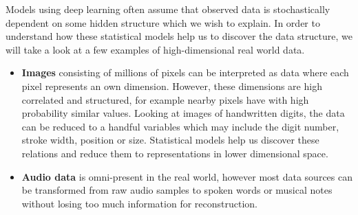 Models using deep learning often assume that observed data is stochastically dependent on some hidden structure which we wish to explain.
In order to understand how these statistical models help us to discover the data structure, we will take a look at a few examples of high-dimensional real world data.
\begin{itemize}
  \item \textbf{Images} consisting of millions of pixels can be interpreted as data where each pixel represents an own dimension.
  However, these dimensions are high correlated and structured, for example nearby pixels have with high probability similar values.
  Looking at images of handwritten digits, the data can be reduced to a handful variables which may include the digit number, stroke width, position or size.
  Statistical models help us discover these relations and reduce them to representations in lower dimensional space.
  \item \textbf{Audio data} is omni-present in the real world, however most data sources can be transformed from raw audio samples to spoken words or musical notes without losing too much information for reconstruction.
\end{itemize}


